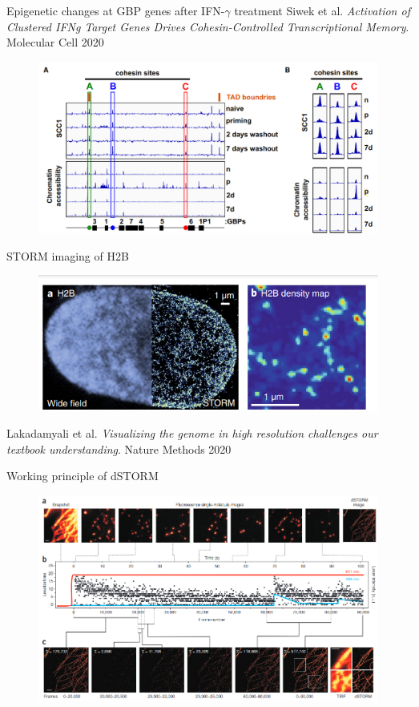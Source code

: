 \documentclass[aspectratio=1610]{beamer}					%
\begin{document}
\begin{frame}{Epigenetic changes at GBP genes after IFN-$\gamma$ treatment}
Siwek et al. \textit{Activation of Clustered IFNg Target Genes Drives Cohesin-Controlled Transcriptional Memory}. Molecular Cell 2020
\begin{figure}
\includegraphics[width=12cm]{Epigenetic.png}
\end{figure}
\end{frame}

\begin{frame}{STORM imaging of H2B}
\begin{figure}
\includegraphics[width=12cm]{STORM.png}
\end{figure}
Lakadamyali et al. \textit{Visualizing the genome in high resolution
challenges our textbook understanding}. Nature Methods 2020
\end{frame}

\begin{frame}{Working principle of dSTORM}
\begin{figure}
\includegraphics[width=13cm]{dSTORM2.png}
\end{figure}
\end{frame}
\end{document}
